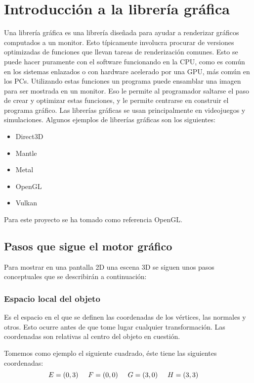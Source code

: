 \chapter{Introducción a la librería gráfica}
Una librería gráfica es una librería diseñada para ayudar a renderizar gráficos computados a un monitor. Esto típicamente involucra procurar de versiones optimizadas de funciones que llevan tareas de renderización comunes. Esto se puede hacer puramente con el software funcionando en la CPU, como es común en los sistemas enlazados o con hardware acelerado por una GPU, más común en los PCs. Utilizando estas funciones un programa puede ensamblar una imagen para ser mostrada en un monitor. Eso le permite al programador saltarse el paso de crear y optimizar estas funciones, y le permite centrarse en construir el programa gráfico. Las librerías gráficas se usan principalmente en videojuegos y simulaciones.
Algunos ejemplos de librerías gráficas son los siguientes:
\begin{itemize}
\item{Direct3D}
\item{Mantle}
\item{Metal}
\item{OpenGL}
\item{Vulkan}
\end{itemize}
Para este proyecto se ha tomado como referencia OpenGL.

\newpage
\section{Pasos que sigue el motor gráfico}
Para mostrar en una pantalla 2D una escena 3D se siguen unos pasos conceptuales que se describirán a continuación: 
\subsection{Espacio local del objeto}
Es el espacio en el que se definen las coordenadas de los vértices, las normales y otros. Esto ocurre antes de que tome lugar cualquier transformación. Las coordenadas son relativas al centro del objeto en cuestión. 

Tomemos como ejemplo el siguiente cuadrado, éste tiene las siguientes coordenadas:
\[
E = (0, 3) \hspace*{0.5cm}
F = (0, 0) \hspace*{0.5cm} 
G = (3, 0) \hspace*{0.5cm} 
H = (3, 3) \hspace*{0.5cm} 
\]

